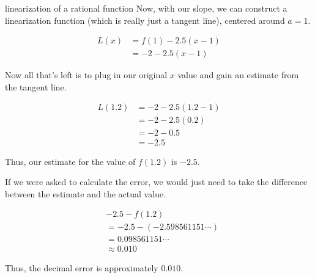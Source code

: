 \begin{example}{linearization of a rational function}
    Now, with our slope, we can construct a linearization function (which is really just a tangent line), centered around \( a = 1 \).
    
    \begin{align}
        L \left( x \right) &= f \left( 1 \right) - 2.5 \left( x - 1 \right) \\
        &= -2 - 2.5 \left( x - 1 \right)
    \end{align}
    
    Now all that's left is to plug in our original \( x \) value and gain an estimate from the tangent line.
    
    \begin{align}
        L \left( 1.2 \right) &= -2 - 2.5 \left( 1.2 - 1 \right) \\
        &= -2 - 2.5 \left( 0.2 \right) \\
        &= -2 - 0.5 \\
        &= -2.5
    \end{align}
    
    Thus, our estimate for the value of \( f \left( 1.2 \right) \) is \( -2.5 \).
    
    If we were asked to calculate the error, we would just need to take the difference between the estimate and the actual value.
    
    \begin{align}
        &-2.5 - f \left( 1.2 \right) \\
        &= -2.5 - \left( -2.598561151 \cdots \right) \\
        &= 0.098561151 \cdots \\
        &\approx 0.010
    \end{align}
    
    Thus, the decimal error is approximately \( 0.010 \).
\end{example}

